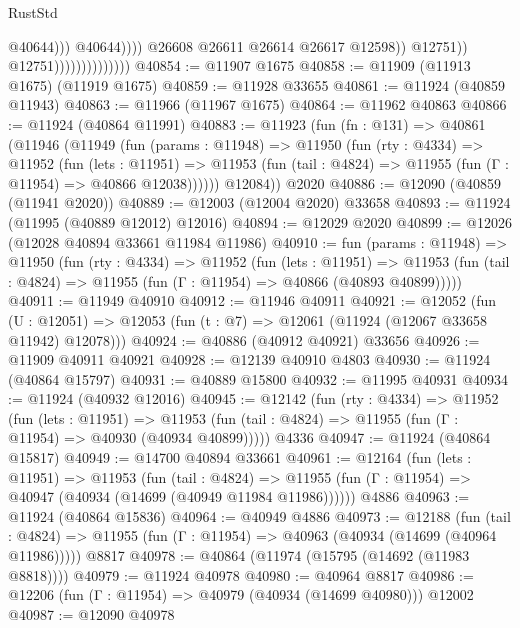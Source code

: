 \begin{lexlean}{RustStd}
\begin{coremodule}
{\begin{coremodule}
{{{{{{{{{{{{{{{{{{{{{{{{{{{{{{{{{{{{{{{{{{{{{{{{{{{{{{{{{{{{{{{{{{{{{{{{{{{{{{{{                                                      @40644)))
                                                @40644))))
                                        @26608
                                        @26611
                                        @26614
                                        @26617
                                        @12598))
                                    @12751))
                                @12751))))))))))))))
@40854 := @11907 @1675
@40858 := @11909 (@11913 @1675) (@11919 @1675)
@40859 := @11928 @33655
@40861 := @11924 (@40859 @11943)
@40863 := @11966 (@11967 @1675)
@40864 := @11962 @40863
@40866 := @11924 (@40864 @11991)
@40883 := @11923
    (fun (fn : @131) =>
    @40861
      (@11946
        (@11949
          (fun (params : @11948) =>
          @11950
            (fun (rty : @4334) =>
            @11952
              (fun (lets : @11951) =>
              @11953 (fun (tail : @4824) => @11955 (fun (Γ : @11954) => @40866 @12038))))))
        @12084))
    @2020
@40886 := @12090 (@40859 (@11941 @2020))
@40889 := @12003 (@12004 @2020) @33658
@40893 := @11924 (@11995 (@40889 @12012) @12016)
@40894 := @12029 @2020
@40899 := @12026 (@12028 @40894 @33661 @11984 @11986)
@40910 := fun (params : @11948) =>
  @11950
    (fun (rty : @4334) =>
    @11952
      (fun (lets : @11951) =>
      @11953 (fun (tail : @4824) => @11955 (fun (Γ : @11954) => @40866 (@40893 @40899)))))
@40911 := @11949 @40910
@40912 := @11946 @40911
@40921 := @12052
    (fun (U : @12051) => @12053 (fun (t : @7) => @12061 (@11924 (@12067 @33658 @11942) @12078)))
@40924 := @40886 (@40912 @40921) @33656
@40926 := @11909 @40911 @40921
@40928 := @12139 @40910 @4803
@40930 := @11924 (@40864 @15797)
@40931 := @40889 @15800
@40932 := @11995 @40931
@40934 := @11924 (@40932 @12016)
@40945 := @12142
    (fun (rty : @4334) =>
    @11952
      (fun (lets : @11951) =>
      @11953 (fun (tail : @4824) => @11955 (fun (Γ : @11954) => @40930 (@40934 @40899)))))
    @4336
@40947 := @11924 (@40864 @15817)
@40949 := @14700 @40894 @33661
@40961 := @12164
    (fun (lets : @11951) =>
    @11953
      (fun (tail : @4824) =>
      @11955 (fun (Γ : @11954) => @40947 (@40934 (@14699 (@40949 @11984 @11986))))))
    @4886
@40963 := @11924 (@40864 @15836)
@40964 := @40949 @4886
@40973 := @12188
    (fun (tail : @4824) => @11955 (fun (Γ : @11954) => @40963 (@40934 (@14699 (@40964 @11986)))))
    @8817
@40978 := @40864 (@11974 (@15795 (@14692 (@11983 @8818))))
@40979 := @11924 @40978
@40980 := @40964 @8817
@40986 := @12206 (fun (Γ : @11954) => @40979 (@40934 (@14699 @40980))) @12002
@40987 := @12090 @40978
}}}}}}}}}}}}}}}}}}}}}}}}}}}}}}}}}}}}}}}}}}}}}}}}}}}}}}}}}}}}}}}}}}}}}}}}}}}}}}}}
\end{coremodule}}
\end{coremodule}
\end{lexlean}
